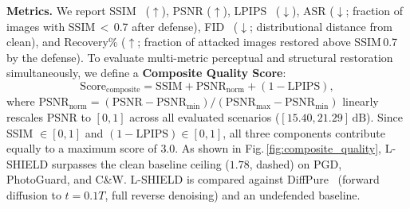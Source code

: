 \documentclass[conference]{IEEEtran}
\begin{document}
\textbf{Metrics.} We report SSIM~\cite{wang2004image} ($\uparrow$),
PSNR ($\uparrow$), LPIPS~\cite{zhang2018unreasonable} ($\downarrow$),
ASR ($\downarrow$; fraction of images with SSIM\,$<$\,0.7 after defense),
FID~\cite{heusel2017gans} ($\downarrow$; distributional distance from clean),
and Recovery\% ($\uparrow$; fraction of attacked images restored above
SSIM\,0.7 by the defense). To evaluate multi-metric perceptual and structural
restoration simultaneously, we define a \textbf{Composite Quality Score}:
\begin{equation}
  \mathrm{Score}_{\mathrm{composite}} = \mathrm{SSIM} + \mathrm{PSNR}_{\mathrm{norm}} + (1 - \mathrm{LPIPS}),
\end{equation}
where $\mathrm{PSNR}_{\mathrm{norm}} = (\mathrm{PSNR} - \mathrm{PSNR}_{\min})/(\mathrm{PSNR}_{\max} - \mathrm{PSNR}_{\min})$
linearly rescales PSNR to $[0,1]$ across all evaluated scenarios ($[15.40, 21.29]\,\text{dB}$).
Since SSIM $\in [0,1]$ and $(1 - \mathrm{LPIPS}) \in [0,1]$, all three components contribute
equally to a maximum score of $3.0$. As shown in Fig.\,\ref{fig:composite_quality}, L-SHIELD surpasses the clean baseline ceiling ($1.78$, dashed) on PGD, PhotoGuard, and C\&W. L-SHIELD is compared against
DiffPure~\cite{nie2022diffusion} (forward diffusion to $t\!=\!0.1T$,
full reverse denoising) and an undefended baseline.
\end{document}
